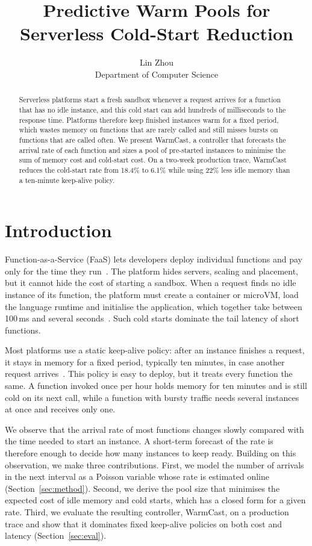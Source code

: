 \documentclass[10pt]{article}
\title{Predictive Warm Pools for Serverless Cold-Start Reduction}
\author{Lin Zhou\\Department of Computer Science}
\date{}
\begin{document}
\maketitle

\begin{abstract}
Serverless platforms start a fresh sandbox whenever a request arrives for a
function that has no idle instance, and this cold start can add hundreds of
milliseconds to the response time. Platforms therefore keep finished instances
warm for a fixed period, which wastes memory on functions that are rarely
called and still misses bursts on functions that are called often. We present
WarmCast, a controller that forecasts the arrival rate of each function and
sizes a pool of pre-started instances to minimise the sum of memory cost and
cold-start cost. On a two-week production trace, WarmCast reduces the
cold-start rate from 18.4\% to 6.1\% while using 22\% less idle memory than a
ten-minute keep-alive policy.
\end{abstract}

\section{Introduction}
\label{sec:intro}

Function-as-a-Service (FaaS) lets developers deploy individual functions and
pay only for the time they run~\cite{jonas2019cloud}. The platform hides
servers, scaling and placement, but it cannot hide the cost of starting a
sandbox. When a request finds no idle instance of its function, the platform
must create a container or microVM, load the language runtime and initialise
the application, which together take between 100\,ms and several
seconds~\cite{wang2018peeking,oakes2018sock}. Such cold starts dominate the
tail latency of short functions.

Most platforms use a static keep-alive policy: after an instance finishes a
request, it stays in memory for a fixed period, typically ten minutes, in case
another request arrives~\cite{shahrad2020serverless}. This policy is easy to
deploy, but it treats every function the same. A function invoked once per
hour holds memory for ten minutes and is still cold on its next call, while a
function with bursty traffic needs several instances at once and receives
only one.

We observe that the arrival rate of most functions changes slowly compared
with the time needed to start an instance. A short-term forecast of the rate
is therefore enough to decide how many instances to keep ready. Building on
this observation, we make three contributions. First, we model the number of
arrivals in the next interval as a Poisson variable whose rate is estimated
online (Section~\ref{sec:method}). Second, we derive the pool size that
minimises the expected cost of idle memory and cold starts, which has a
closed form for a given rate. Third, we evaluate the resulting controller,
WarmCast, on a production trace and show that it dominates fixed keep-alive
policies on both cost and latency (Section~\ref{sec:eval}).
\end{document}
